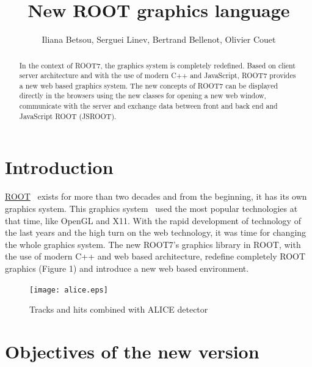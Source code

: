 \documentclass[a4paper]{jpconf}
\begin{document}
\title{New ROOT graphics language}

\author{Iliana Betsou, Serguei Linev, Bertrand Bellenot, Olivier Couet}

\address{Production Editor, \jpcs, \iopp, Dirac House, Temple Back, Bristol BS1~6BE, UK}


\begin{abstract}
In the context of ROOT7, the graphics system is completely redefined. Based on client
server architecture and with the use of modern C++ and JavaScript, ROOT7 provides a
new web based graphics system. The new concepts of ROOT7 can be displayed directly
in the browsers using the new classes for opening a new web window, communicate
with the server and exchange data between front and back end and JavaScript ROOT (JSROOT).
\end{abstract}

\section{Introduction}
\href{https://root.cern/}{ROOT}~\cite{root} exists for more than two decades and
from the beginning, it has its own graphics system. This graphics system~\cite{Antcheva:2011zz}
used the most popular technologies at that time, like OpenGL and X11. With the rapid development
of technology of the last years and the high turn on the web technology, it was time for
changing the whole graphics system. The new ROOT7's graphics library in ROOT, with the
use of modern C++ and web based architecture, redefine completely ROOT graphics (Figure 1)
 and introduce a new web based environment.
\\
\begin{figure}[h]
  \begin{center}
    \texttt{[image: alice.eps]}\hspace{2pc}%
  \end{center}
\centering
\begin{minipage}[b]{25pc}\caption{\label{label}Tracks and hits combined with ALICE detector}
\end{minipage}
\end{figure}


\section{Objectives of the new version}
\end{document}
